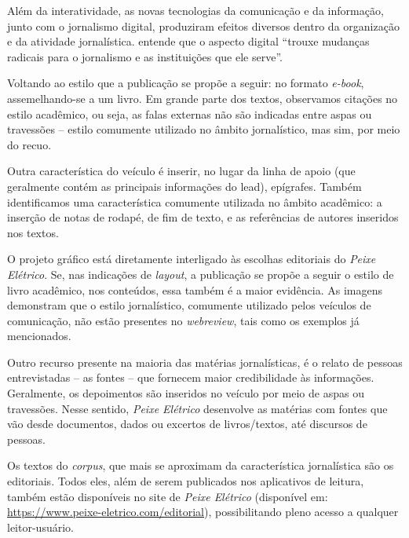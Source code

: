 \documentclass[portuguese]{textolivre}
\begin{document}
Além da interatividade, as novas tecnologias da comunicação e da informação, junto com o jornalismo digital, produziram efeitos diversos dentro da organização e da atividade jornalística. \textcite[p. 94]{pavlik2011} entende que o aspecto digital “trouxe mudanças radicais para o jornalismo e as instituições que ele serve”.

Voltando ao estilo que a publicação se propõe a seguir: no formato \textit{e-book}, assemelhando-se a um livro. Em grande parte dos textos, observamos citações no estilo acadêmico, ou seja, as falas externas não são indicadas entre aspas ou travessões – estilo comumente utilizado no âmbito jornalístico, mas sim, por meio do recuo.

Outra característica do veículo é inserir, no lugar da linha de apoio (que geralmente contém as principais informações do lead), epígrafes. Também identificamos uma característica comumente utilizada no âmbito acadêmico: a inserção de notas de rodapé, de fim de texto, e as referências de autores inseridos nos textos.

O projeto gráfico está diretamente interligado às escolhas editoriais do \textit{Peixe Elétrico}. Se, nas indicações de \textit{layout}, a publicação se propõe a seguir o estilo de livro acadêmico, nos conteúdos, essa também é a maior evidência. As imagens demonstram que o estilo jornalístico, comumente utilizado pelos veículos de comunicação, não estão presentes no \textit{webreview}, tais como os exemplos já mencionados.

Outro recurso presente na maioria das matérias jornalísticas, é o relato de pessoas entrevistadas – as fontes – que fornecem maior credibilidade às informações. Geralmente, os depoimentos são inseridos no veículo por meio de aspas ou travessões. Nesse sentido, \textit{Peixe Elétrico} desenvolve as matérias com fontes que vão desde documentos, dados ou excertos de livros/textos, até discursos de pessoas.

Os textos do \textit{corpus}, que mais se aproximam da característica jornalística são os editoriais. Todos eles, além de serem publicados nos aplicativos de leitura, também estão disponíveis no site de \textit{Peixe Elétrico} (disponível em: \url{https://www.peixe-eletrico.com/editorial}), possibilitando pleno acesso a qualquer leitor-usuário.
\end{document}
